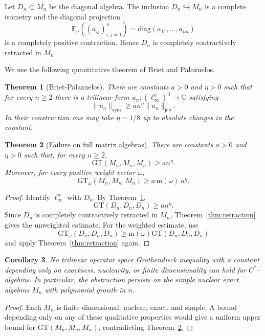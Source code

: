 \documentclass[11pt]{amsart}
\newtheorem{theorem}{Theorem}[section]
\newtheorem{corollary}[theorem]{Corollary}
\theoremstyle{definition}
\newcommand{\C}{\mathbb C}
\newcommand{\jcb}{\mathrm{jcb}}
\newcommand{\sym}{\mathrm{sym}}
\newcommand{\diag}{\mathrm{diag}}
\newcommand{\minw}{\mathrm{m}}
\newcommand{\GT}{\mathrm{GT}}
\begin{document}
Let $D_n\subset M_n$ be the diagonal algebra. The inclusion
$D_n\hookrightarrow M_n$ is a complete isometry and the diagonal projection
\[
   \mathbb E_n((a_{ij})_{i,j=1}^n)=\diag(a_{11},\ldots,a_{nn})
\]
is a completely positive contraction. Hence $D_n$ is completely
contractively retracted in $M_n$.

We use the following quantitative theorem of Briet and Palazuelos.

\begin{theorem}[Briet-Palazuelos]
\label{thm:bp}
There are constants $a>0$ and $\eta>0$ such that for every $n\ge 2$ there is
a trilinear form $u_n:(\ell_\infty^n)^3\to\C$ satisfying
\[
   \|u_n\|_{\sym}\ge a n^\eta\|u_n\|_{\jcb}.
\]
In their construction one may take $\eta=1/8$ up to absolute changes in the
constant.
\end{theorem}

\begin{theorem}[Failure on full matrix algebras]
\label{thm:matrix}
There are constants $a>0$ and $\eta>0$ such that, for every $n\ge2$,
\[
   \GT(M_n,M_n,M_n)\ge a n^\eta .
\]
Moreover, for every positive weight vector $\omega$,
\[
   \GT_\omega(M_n,M_n,M_n)\ge a\,\minw(\omega)\,n^\eta .
\]
\end{theorem}

\begin{proof}
Identify $\ell_\infty^n$ with $D_n$. By Theorem~\ref{thm:bp},
\[
   \GT(D_n,D_n,D_n)\ge a n^\eta .
\]
Since $D_n$ is completely contractively retracted in $M_n$,
Theorem~\ref{thm:retraction} gives the unweighted estimate. For the weighted
estimate, use
\[
   \GT_\omega(D_n,D_n,D_n)
   \ge
   \minw(\omega)\GT(D_n,D_n,D_n)
\]
and apply Theorem~\ref{thm:retraction} again.
\end{proof}

\begin{corollary}
\label{cor:no-exact-nuclear}
No trilinear operator space Grothendieck inequality with a constant depending
only on exactness, nuclearity, or finite dimensionality can hold for
$C^*$-algebras. In particular, the obstruction persists on the simple nuclear
exact algebras $M_n$ with polynomial growth in $n$.
\end{corollary}

\begin{proof}
Each $M_n$ is finite dimensional, nuclear, exact, and simple. A bound
depending only on any of these qualitative properties would give a uniform
upper bound for $\GT(M_n,M_n,M_n)$, contradicting
Theorem~\ref{thm:matrix}.
\end{proof}
\end{document}
